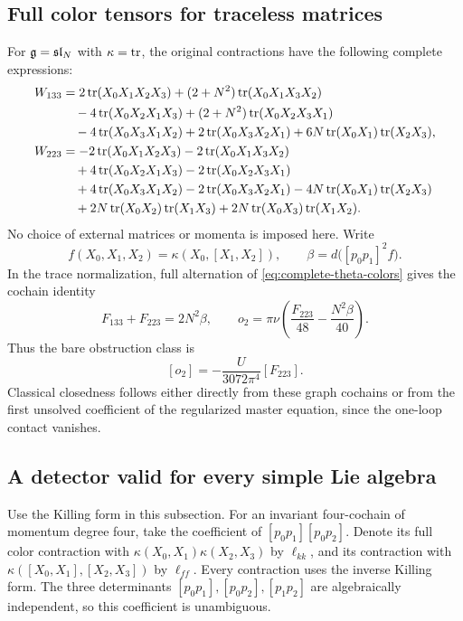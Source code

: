 \subsection{Full color tensors for traceless matrices}

For $\mathfrak g=\mathfrak{sl}_N$ with $\kappa=\operatorname{tr}$, the original contractions have
the following complete expressions:
\begin{align}
 W_{133}
 &=2\operatorname{tr}(X_0X_1X_2X_3)
   +(2+N^2)\operatorname{tr}(X_0X_1X_3X_2)\notag\\
 &\quad-4\operatorname{tr}(X_0X_2X_1X_3)
   +(2+N^2)\operatorname{tr}(X_0X_2X_3X_1)\notag\\
 &\quad-4\operatorname{tr}(X_0X_3X_1X_2)
   +2\operatorname{tr}(X_0X_3X_2X_1)
   +6N\operatorname{tr}(X_0X_1)\operatorname{tr}(X_2X_3),\notag\\
 W_{223}
 &=-2\operatorname{tr}(X_0X_1X_2X_3)-2\operatorname{tr}(X_0X_1X_3X_2)\notag\\
 &\quad+4\operatorname{tr}(X_0X_2X_1X_3)-2\operatorname{tr}(X_0X_2X_3X_1)\notag\\
 &\quad+4\operatorname{tr}(X_0X_3X_1X_2)-2\operatorname{tr}(X_0X_3X_2X_1)
       -4N\operatorname{tr}(X_0X_1)\operatorname{tr}(X_2X_3)\notag\\
 &\quad+2N\operatorname{tr}(X_0X_2)\operatorname{tr}(X_1X_3)
       +2N\operatorname{tr}(X_0X_3)\operatorname{tr}(X_1X_2).
 \label{eq:complete-theta-colors}
\end{align}
No choice of external matrices or momenta is imposed here.
Write
\[
 f(X_0,X_1,X_2)=\kappa(X_0,[X_1,X_2]),\qquad
 \beta=d\bigl([p_0p_1]^2f\bigr).
\]
In the trace normalization, full alternation of
\eqref{eq:complete-theta-colors} gives the cochain identity
\begin{equation}
 F_{133}+F_{223}=2N^2\beta,\qquad
 o_2=\pi\nu\left(\frac{F_{223}}{48}
                         -\frac{N^2\beta}{40}\right).
 \label{eq:sl-theta-boundary}
\end{equation}
Thus the bare obstruction class is
\[
 [o_2]=-\frac{U}{3072\pi^4}[F_{223}].
\]
Classical closedness follows either directly from these graph
cochains or from the first unsolved coefficient of the
regularized master equation, since the one-loop contact vanishes.

\subsection{A detector valid for every simple Lie algebra}

Use the Killing form in this subsection. For an invariant
four-cochain of momentum degree four, take the coefficient of
$[p_0p_1][p_0p_2]$. Denote its full color contraction with
$\kappa(X_0,X_1)\kappa(X_2,X_3)$ by $\ell_{kk}$, and its
contraction with $\kappa([X_0,X_1],[X_2,X_3])$ by $\ell_{ff}$.
Every contraction uses the inverse Killing form. The three
determinants $[p_0p_1],[p_0p_2],[p_1p_2]$ are algebraically
independent, so this coefficient is unambiguous.

